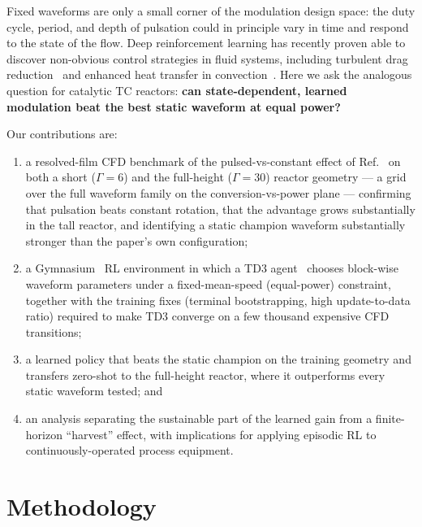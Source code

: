 \documentclass{article}
\begin{document}
Fixed waveforms are only a small corner of the modulation design space: the
duty cycle, period, and depth of pulsation could in principle vary in time and
respond to the state of the flow. Deep reinforcement learning has recently
proven able to discover non-obvious control strategies in fluid systems,
including turbulent drag reduction~\cite{lee2023turbulence} and enhanced heat
transfer in convection~\cite{zhou2025deep}. Here we ask the analogous question
for catalytic TC reactors: \textbf{can state-dependent, learned modulation beat
the best static waveform at equal power?}

Our contributions are:
\begin{enumerate}
  \item a resolved-film CFD benchmark of the pulsed-vs-constant effect of
        Ref.~\cite{lopez2024process} on both a short ($\Gamma = 6$) and the
        full-height ($\Gamma = 30$) reactor geometry --- a grid over the full
        waveform family on the conversion-vs-power plane --- confirming that
        pulsation beats constant rotation, that the advantage grows
        substantially in the tall reactor, and identifying a static champion
        waveform substantially stronger than the paper's own configuration;
  \item a Gymnasium~\cite{towers2024gymnasium} RL environment in which a TD3
        agent~\cite{fujimoto2018addressing} chooses block-wise waveform
        parameters under a fixed-mean-speed (equal-power) constraint, together
        with the training fixes (terminal bootstrapping, high update-to-data
        ratio) required to make TD3 converge on a few thousand expensive CFD
        transitions;
  \item a learned policy that beats the static champion on the training
        geometry and transfers zero-shot to the full-height reactor, where it
        outperforms every static waveform tested; and
  \item an analysis separating the sustainable part of the learned gain from a
        finite-horizon ``harvest'' effect, with implications for applying
        episodic RL to continuously-operated process equipment.
\end{enumerate}

\section{Methodology}
\end{document}
